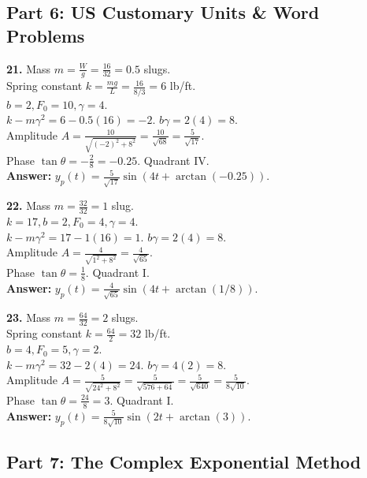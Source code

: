 \documentclass[11pt]{article}
\begin{document}
\subsection*{Part 6: US Customary Units \& Word Problems}

\textbf{21.} Mass $m = \frac{W}{g} = \frac{16}{32} = 0.5$ slugs. \\
Spring constant $k = \frac{mg}{L} = \frac{16}{8/3} = 6$ lb/ft. \\
$b = 2, F_0 = 10, \gamma = 4$. \\
$k - m\gamma^2 = 6 - 0.5(16) = -2$. $b\gamma = 2(4) = 8$. \\
Amplitude $A = \frac{10}{\sqrt{(-2)^2 + 8^2}} = \frac{10}{\sqrt{68}} = \frac{5}{\sqrt{17}}$. \\
Phase $\tan \theta = -\frac{2}{8} = -0.25$. Quadrant IV. \\
\textbf{Answer:} $y_p(t) = \frac{5}{\sqrt{17}} \sin(4t + \arctan(-0.25))$.

\vspace{0.5cm}
\textbf{22.} Mass $m = \frac{32}{32} = 1$ slug. \\
$k = 17, b = 2, F_0 = 4, \gamma = 4$. \\
$k - m\gamma^2 = 17 - 1(16) = 1$. $b\gamma = 2(4) = 8$. \\
Amplitude $A = \frac{4}{\sqrt{1^2 + 8^2}} = \frac{4}{\sqrt{65}}$. \\
Phase $\tan \theta = \frac{1}{8}$. Quadrant I. \\
\textbf{Answer:} $y_p(t) = \frac{4}{\sqrt{65}} \sin(4t + \arctan(1/8))$.

\vspace{0.5cm}
\textbf{23.} Mass $m = \frac{64}{32} = 2$ slugs. \\
Spring constant $k = \frac{64}{2} = 32$ lb/ft. \\
$b = 4, F_0 = 5, \gamma = 2$. \\
$k - m\gamma^2 = 32 - 2(4) = 24$. $b\gamma = 4(2) = 8$. \\
Amplitude $A = \frac{5}{\sqrt{24^2 + 8^2}} = \frac{5}{\sqrt{576 + 64}} = \frac{5}{\sqrt{640}} = \frac{5}{8\sqrt{10}}$. \\
Phase $\tan \theta = \frac{24}{8} = 3$. Quadrant I. \\
\textbf{Answer:} $y_p(t) = \frac{5}{8\sqrt{10}} \sin(2t + \arctan(3))$.

\subsection*{Part 7: The Complex Exponential Method}
\end{document}
